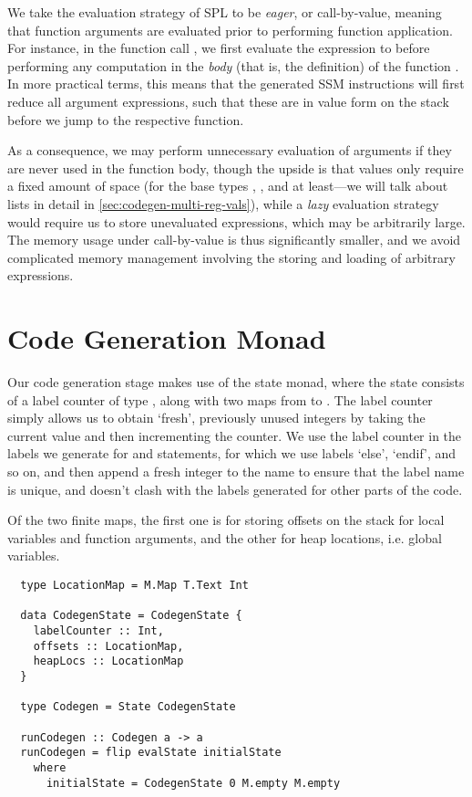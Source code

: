 We take the evaluation strategy of SPL to be \emph{eager}, or call-by-value,
meaning that function arguments are evaluated prior to performing function
application. For instance, in the function call , we first evaluate
the expression  to  before performing any computation in the
\emph{body} (that is, the definition) of the function .
In more practical terms, this means that the generated SSM instructions will
first reduce all argument expressions, such that these are in value form on the
stack before we jump to the respective function.

As a consequence, we may perform unnecessary evaluation of arguments if they are
never used in the function body, though the upside is that values only require
a fixed amount of space (for the base types , , and
 at least---we will talk about lists in detail in
\cref{sec:codegen-multi-reg-vals}), while a \emph{lazy} evaluation strategy
would require us to store unevaluated expressions, which may be arbitrarily
large. The memory usage under call-by-value is thus significantly smaller, and
we avoid complicated memory management involving the storing and loading of
arbitrary expressions.



\section{Code Generation Monad} \label{sec:codegen-monad}

Our code generation stage makes use of the state monad, where the state consists
of a label counter of type , along with two maps from
 to .
The label counter simply allows us to obtain `fresh', previously unused integers
by taking the current value and then incrementing the counter. We use the label
counter in the labels we generate for  and  statements, for
which we use labels `else', `endif', and so on, and then append a fresh integer
to the name to ensure that the label name is unique, and doesn't clash with the
labels generated for other parts of the code.

Of the two finite maps, the first one is for storing offsets on the stack for
local variables and function arguments, and the other for heap locations, i.e.
global variables.

\begin{verbatim}
  type LocationMap = M.Map T.Text Int

  data CodegenState = CodegenState {
    labelCounter :: Int,
    offsets :: LocationMap,
    heapLocs :: LocationMap
  }

  type Codegen = State CodegenState

  runCodegen :: Codegen a -> a
  runCodegen = flip evalState initialState
    where
      initialState = CodegenState 0 M.empty M.empty
\end{verbatim}

